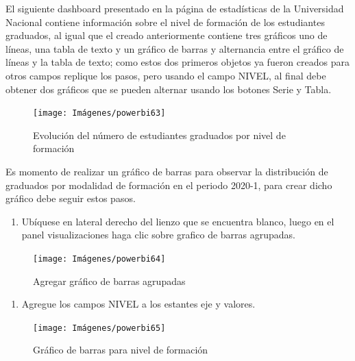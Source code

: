 \documentclass[
]{book}
\providecommand{\tightlist}{%
  \setlength{\itemsep}{0pt}\setlength{\parskip}{0pt}}
\begin{document}
El siguiente dashboard presentado en la página de estadísticas de la Universidad Nacional contiene información sobre el nivel de formación de los estudiantes graduados, al igual que el creado anteriormente contiene tres gráficos uno de líneas, una tabla de texto y un gráfico de barras y alternancia entre el gráfico de líneas y la tabla de texto; como estos dos primeros objetos ya fueron creados para otros campos replique los pasos, pero usando el campo NIVEL, al final debe obtener dos gráficos que se pueden alternar usando los botones Serie y Tabla.

\begin{figure}

{\centering \texttt{[image: Imágenes/powerbi63]} 

}

\caption{Evolución del número de estudiantes graduados por nivel de formación}\label{fig:evolucionnivelformacion-fig}
\end{figure}

Es momento de realizar un gráfico de barras para observar la distribución de graduados por modalidad de formación en el periodo 2020-1, para crear dicho gráfico debe seguir estos pasos.

\begin{enumerate}
\def\labelenumi{\arabic{enumi}.}
\tightlist
\item
  Ubíquese en lateral derecho del lienzo que se encuentra blanco, luego en el panel visualizaciones haga clic sobre grafico de barras agrupadas.
\end{enumerate}

\begin{figure}

{\centering \texttt{[image: Imágenes/powerbi64]} 

}

\caption{Agregar gráfico de barras agrupadas}\label{fig:paso1barras-fig}
\end{figure}

\begin{enumerate}
\def\labelenumi{\arabic{enumi}.}
\setcounter{enumi}{1}
\tightlist
\item
  Agregue los campos NIVEL a los estantes eje y valores.
\end{enumerate}

\begin{figure}

{\centering \texttt{[image: Imágenes/powerbi65]} 

}

\caption{Gráfico de barras para nivel de formación}\label{fig:paso2barras-fig}
\end{figure}
\end{document}
